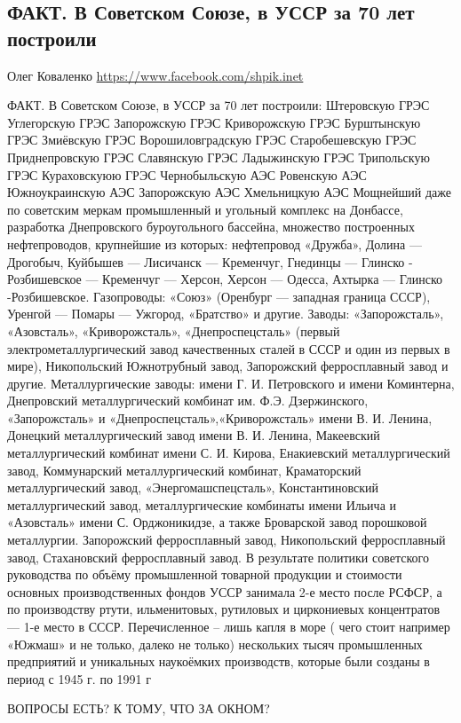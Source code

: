  

 

\subsection{ФАКТ. В Советском Союзе, в УССР за 70 лет построили}

Олег Коваленко
\url{https://www.facebook.com/shpik.inet}

ФАКТ. В Советском Союзе, в УССР за 70 лет построили:
Штеровскую ГРЭС
Углегорскую ГРЭС
Запорожскую ГРЭС
Криворожскую ГРЭС
Бурштынскую ГРЭС
Змиёвскую ГРЭС
Ворошиловградскую ГРЭС
Старобешевскую ГРЭС
Приднепровскую ГРЭС
Славянскую ГРЭС
Ладыжинскую ГРЭС
Трипольскую ГРЭС
Кураховскуюю ГРЭС
Чернобыльскую АЭС
Ровенскую АЭС
Южноукраинскую АЭС
Запорожскую АЭС
Хмельницкую АЭС
Мощнейший даже по советским меркам промышленный и угольный комплекс на Донбассе, разработка Днепровского буроугольного бассейна, множество построенных нефтепроводов, крупнейшие из которых: 
нефтепровод «Дружба», Долина — Дрогобыч, Куйбышев — Лисичанск — Кременчуг, Гнединцы — Глинско - Розбишевское — Кременчуг — Херсон, Херсон — Одесса, Ахтырка — Глинско -Розбишевское. 
Газопроводы: «Союз» (Оренбург — западная граница СССР), Уренгой — Помары — Ужгород, «Братство» и другие.
Заводы:
«Запорожсталь», «Азовсталь», «Криворожсталь», «Днепроспецсталь» (первый электрометаллургический завод качественных сталей в СССР и один из первых в мире), Никопольский Южнотрубный завод, Запорожский ферросплавный завод и другие.
Металлургические заводы:
имени Г. И. Петровского и имени Коминтерна, Днепровский металлургический комбинат им. Ф.Э. Дзержинского, «Запорожсталь» и «Днепроспецсталь»,«Криворожсталь» имени В. И. Ленина,
Донецкий металлургический завод имени В. И. Ленина, Макеевский металлургический комбинат имени С. И. Кирова, Енакиевский металлургический завод, Коммунарский металлургический комбинат, Краматорский металлургический завод, «Энергомашспецсталь», Константиновский металлургический завод, металлургические комбинаты имени Ильича и «Азовсталь» имени С. Орджоникидзе,
а также Броварской завод порошковой металлургии.
Запорожский ферросплавный завод, Никопольский ферросплавный завод, Стахановский ферросплавный завод.
В результате политики советского руководства по объёму промышленной товарной продукции и стоимости основных производственных фондов УССР занимала 2-е место после РСФСР, а по производству ртути, ильменитовых, рутиловых и циркониевых концентратов — 1-е место в СССР.
Перечисленное – лишь капля в море ( чего стоит например «Южмаш» и не только, далеко не только) нескольких тысяч промышленных предприятий и уникальных наукоёмких производств, которые были созданы в период с 1945 г. по 1991 г

ВОПРОСЫ ЕСТЬ? К ТОМУ, ЧТО ЗА ОКНОМ?

